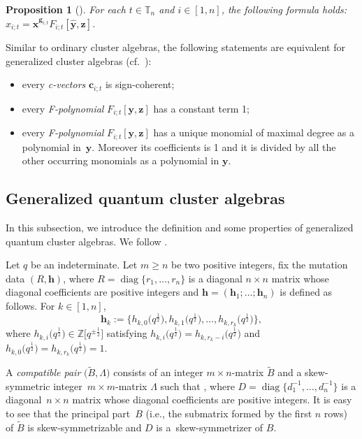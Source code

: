 \documentclass[11pt]{article}
\numberwithin{equation}{section}
\numberwithin{equation}{section}
\newtheorem{Proposition}[Theorem]{Proposition}
 { \theoremstyle{definition}
\newtheorem{Definition}[Theorem]{Definition}
\newtheorem{Note}[Theorem]{Note}
\newtheorem{Example}[Theorem]{Example}
\newtheorem{Remark}[Theorem]{Remark} }
\begin{document}
\begin{Proposition}[{\cite[Theorem 3.23]{Nakanishi14}}]\label{p:separation-formula-gca}
 For each $t\in \mathbb{T}_n$ and $i\in[1,n]$, the following formula holds:
 $
 x_{i;t}=\mathbf{x}^{\mathbf{g}_{i;t}}F_{i;t}[\hat{\mathbf{y}},\mathbf{z}]$.
\end{Proposition}
\begin{Remark}
 Similar to ordinary cluster algebras, the following statements are equivalent for generalized cluster algebras (cf.\ \cite[Proposition 3.19]{Nakanishi14}):
 \begin{itemize}\itemsep=0pt
 \item every {\it c-vectors} $\mathbf{c}_{i;t}$ is sign-coherent;
 \item every {\it F-polynomial} $F_{i;t}[\mathbf{y},\mathbf{z}]$ has a constant term 1;
 \item every {\it F-polynomial} $F_{i;t}[\mathbf{y},\mathbf{z}]$ has a unique monomial of maximal degree as a polynomial in~$\mathbf{y}$. Moreover its coefficients is 1 and it is divided by all the other occurring monomials as a polynomial in $\mathbf{y}$.
\end{itemize}
\end{Remark}

\subsection{Generalized quantum cluster algebras}\label{ss:gqca}
In this subsection, we introduce the definition and some properties of generalized quantum cluster algebras. We follow \cite{BCDX2018}.

Let $q$ be an indeterminate. Let $m\ge n$ be two positive integers, fix the mutation data $(R,\mathbf{h})$, where $R=\operatorname{diag}\{r_1,\dots,r_n\}$ is a diagonal $n\times n$ matrix whose diagonal coefficients are positive integers and $\mathbf{h}=(\mathbf{h}_1;\dots;\mathbf{h}_n)$ is defined as follows.
For $k\in[1,n]$,
\[
\mathbf{h}_{k}:=\bigl\{h_{k,0}\bigl(q^{\frac{1}{2}}\bigr),h_{k,1}\bigl(q^{\frac{1}{2}}\bigr),\dots,h_{k,r_{k}}\bigl(q^{\frac{1}{2}}\bigr)\bigr\},
\]
where $h_{k,i}\bigl(q^{\frac{1}{2}}\bigr)\in\mathbb{Z}\big[q^{\pm\frac{1}{2}}\big]$ satisfying $h_{k,i}\bigl(q^{\frac{1}{2}}\bigr)=h_{k,r_{k}-i}\bigl(q^{\frac{1}{2}}\bigr)$
and $h_{k,0}\bigl(q^{\frac{1}{2}}\bigr)=h_{k,r_{k}}\bigl(q^{\frac{1}{2}}\bigr)=1$.

A {\it compatible pair} $\bigl(\tilde{B}, \Lambda\bigr)$ consists of an integer $m\times n$-matrix $\tilde{B}$ and a skew-symmetric integer~${m\times m}$-matrix $\Lambda$ such that
,
where $D=\operatorname{diag}\bigl\{d_1^{-1},\dots, d_n^{-1}\bigr\}$ is a diagonal~${n\times n}$ matrix whose diagonal coefficients are positive integers. It is easy to see that the principal part~$B$ (i.e., the submatrix formed by the first $n$ rows) of $\tilde{B}$ is skew-symmetrizable and $D$ is a~skew-symmetrizer of $B$.
\end{document}
